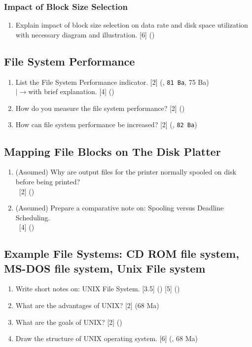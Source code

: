 \documentclass[12pt]{article}
\newcommand{\lb}{\\$\left|\rightarrow\right.$}
\newcommand{\enter}{\\\textcolor{white}{1}}
\begin{document}
		\subsubsection{Impact of Block Size Selection}
			\begin{enumerate}[noitemsep, topsep=0pt]
				\item Explain impact of block size selection on data rate and disk space utilization with necessary diagram and illustration. \hfill [6] ()
			\end{enumerate}
		
	\subsection{File System Performance}
		\begin{enumerate}[noitemsep, topsep=0pt]
			\item List the File System Performance indicator. \hfill [2] (, \texttt{81 Ba}, 75 Ba)
			\lb with brief explanation. \hfill [4] ()

			\item How do you measure the file system performance? \hfill [2] ()
			
			\item How can file system performance be increased? \hfill [2] (, \texttt{82 Ba})
		\end{enumerate}
		
	\subsection{Mapping File Blocks on The Disk Platter}
		\begin{enumerate}[noitemsep, topsep=0pt]
			\item (Assumed) Why are output files for the printer normally spooled on disk before being printed?
			\enter\hfill [2] ()

			\item (Assumed) Prepare a comparative note on: Spooling versus Deadline Scheduling.
			\enter\hfill [4] ()
		\end{enumerate}

	\subsection{Example File Systems: CD ROM file system, MS-DOS file system, Unix File system}
		\begin{enumerate}[noitemsep, topsep=0pt]
			\item Write short notes on: UNIX File System. \hfill [3.5] () [5] ()

			\item What are the advantages of UNIX? \hfill [2] (68 Ma)

			\item What are the goals of UNIX? \hfill [2] ()

			\item Draw the structure of UNIX operating system. \hfill [6] (, 68 Ma)
		\end{enumerate}
\end{document}
